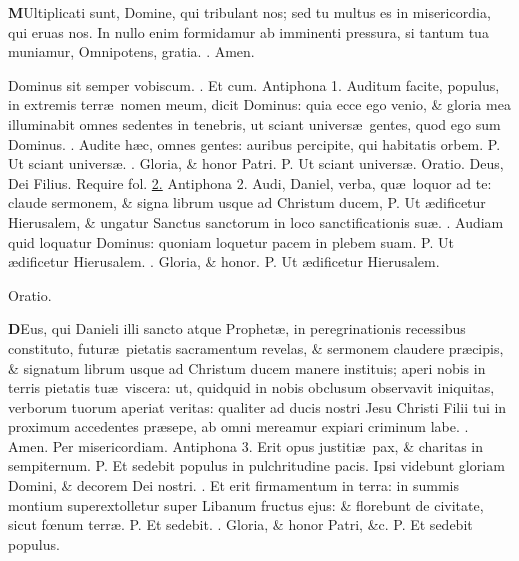 \documentclass[letter,11pt]{book}
\makeatletter
\DeclareRobustCommand{\Vbar}{\vers@resp{-0.1em}{V}}
\DeclareRobustCommand{\Rbar}{\vers@resp{0pt}{R}}
\newcommand{\vers@resp@sym}{\raisebox{0.2ex}{\rotatebox[origin=c]{-20}{$\m@th\rceil$}}}
\newcommand{\vers@resp}[2]{%
  {\ooalign{\hidewidth\kern#1\vers@resp@sym\hidewidth\cr#2\cr}}%
}%
\def\P{\color{Red} P. \color{black}}
\def\V{\color{Red} \Vbar . \color{black}}
\def\R{\color{Red} \Rbar . \color{black}}
\makeatother
\begin{document}
\begin{multicols}{2}
\lettrine[lines=2]{\bfseries \color{Red} M}{}Ultiplicati sunt, Domine, qui tribulant nos; sed tu multus es in misericordia, qui eruas nos. In nullo enim formidamur ab imminenti pressura, si tantum tua muniamur, Omnipotens, gratia. \R Amen.
\par Dominus sit semper vobiscum. \R Et cum.
\newline \color{Red} Antiphona 1. \color{black} Auditum facite, populus, in extremis terr\ae \ nomen meum, dicit Dominus: quia ecce ego venio, \& gloria mea illuminabit omnes sedentes in tenebris, ut sciant univers\ae \ gentes, quod ego sum Dominus. \V Audite h\ae c, omnes gentes: auribus percipite, qui habitatis orbem. \P Ut sciant univers\ae . \V Gloria, \& honor Patri. \P Ut sciant univers\ae .
\newline \color{Red} Oratio. \color{black} Deus, Dei Filius. \color{Red} Require fol. \color{black} \hyperlink{page.2}{2.}
\newline \color{Red} Antiphona 2. \color{black} Audi, Daniel, verba, qu\ae \ loquor ad te: claude sermonem, \& signa librum usque ad Christum ducem, \P Ut \ae dificetur Hierusalem, \& ungatur Sanctus sanctorum in loco sanctificationis su\ae . \V Audiam quid loquatur Dominus: quoniam loquetur pacem in plebem suam. \P Ut \ae dificetur Hierusalem. \V Gloria, \& honor. \P Ut \ae dificetur Hierusalem.
\vspace{-.75em} \begin{center} \color{Red} Oratio. \end{center} \vspace{-.75em}
\lettrine[lines=2]{\bfseries \color{Red} D}{}Eus, qui Danieli illi sancto atque Prophet\ae , in peregrinationis recessibus constituto, futur\ae \ pietatis sacramentum revelas, \& sermonem claudere pr\ae cipis, \& signatum librum usque ad Christum ducem manere instituis; aperi nobis in terris pietatis tu\ae \ viscera: ut, quidquid in nobis obclusum observavit iniquitas, verborum tuorum aperiat veritas: qualiter ad ducis nostri Jesu Christi Filii tui in proximum accedentes pr\ae sepe, ab omni mereamur expiari criminum labe. \R Amen. Per misericordiam.
\newline \color{Red} Antiphona 3. \color{black} Erit opus justiti\ae \ pax, \& charitas in sempiternum. \P Et sedebit populus in pulchritudine pacis. Ipsi videbunt gloriam Domini, \& decorem Dei nostri. \V Et erit firmamentum in terra: in summis montium superextolletur super Libanum fructus ejus: \& florebunt de civitate, sicut f\oe num terr\ae . \P Et sedebit. \V Gloria, \& honor Patri, \&c. \P Et sedebit populus.

\end{multicols}
\end{document}
